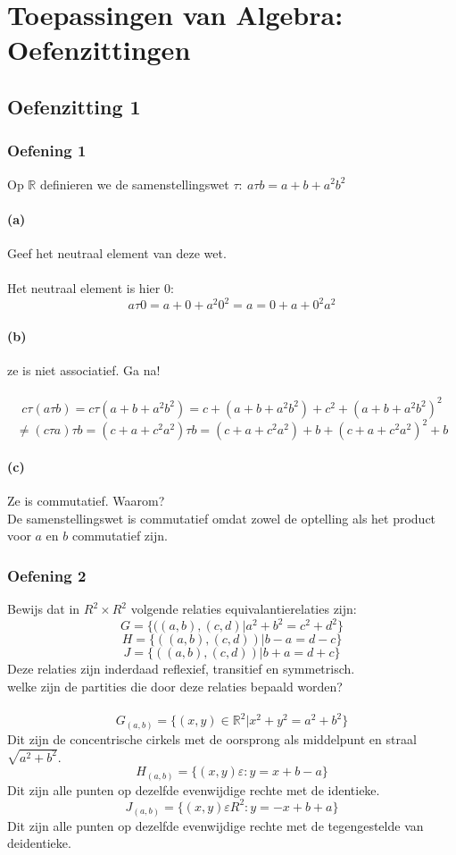 \documentclass[main.tex]{subfiles}
\begin{document}
\chapter{Toepassingen van Algebra: Oefenzittingen}
\label{cha:tai-oefenzittingen}

\section{Oefenzitting 1}

\subsection*{Oefening 1}
Op $\mathbb{R}$ definieren we de samenstellingswet $\tau:\ a\tau b = a + b + a^{2}b^{2}$
\subsubsection*{(a)}
Geef het neutraal element van deze wet.\\\\
Het neutraal element is hier $0$:
\[
a\tau 0=a+0+a^{2}0^{2}=a=0+a+0^{2}a^2
\]

\subsubsection*{(b)}
ze is niet associatief. Ga na!\\\\
\[
c \tau (a \tau b) = c \tau (a+b+a^2b^2)= c+ (a+b+a^2b^2)+c^2+(a+b+a^2b^2)^2
\]
\[
\neq (c \tau a) \tau b= (c+a+c^2a^2) \tau b= (c+a+c^2a^2)+b+(c+a+c^2a^2)^2+b
\]

\subsubsection*{(c)}
Ze is commutatief. Waarom?\\
De samenstellingswet is commutatief omdat zowel de optelling als het product voor $a$ en $b$ commutatief zijn.

\subsection*{Oefening 2}
Bewijs dat in $R^2 \times R^2$ volgende relaties equivalantierelaties zijn:
\[
G= \{((a,b),(c,d)|a^2+b^2=c^2+d^2\}
\]
\[
H=\{((a,b),(c,d))|b-a=d-c\}
\]
\[
J=\{((a,b),(c,d))|b+a=d+c\}
\]
Deze relaties zijn inderdaad reflexief, transitief en symmetrisch.\\
welke zijn de partities die door deze relaties bepaald worden?\\\\
\[
G_{(a,b)}=\{(x,y) \in \mathbb{R}^2|x^2+y^2=a^2+b^2\}
\]
Dit zijn de concentrische cirkels met de oorsprong als middelpunt en straal $\sqrt{a^2+b^2}$.
\[
H_{(a,b)}=\{(x,y) \varepsilon : y=x+b-a\}
\]
Dit zijn alle punten op dezelfde evenwijdige rechte met de identieke.
\[
J_{(a,b)}=\{(x,y) \varepsilon R^2: y=-x+b+a\}
\]
Dit zijn alle punten op dezelfde evenwijdige rechte met de tegengestelde van deidentieke.
\end{document}
